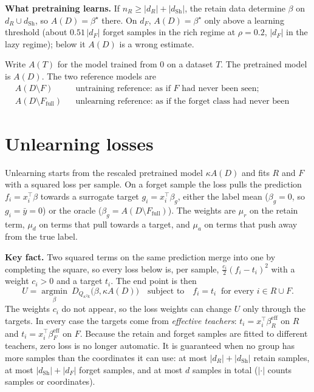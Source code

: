 \documentclass[10pt]{article}
\newcommand{\Ff}{F_{\mathrm{full}}}
\newcommand{\dSh}{d_{\mathrm{Sh}}}
\begin{document}
\textbf{What pretraining learns.} If $n_R\ge|d_R|+|\dSh|$, the retain data determine $\beta$ on $d_R\cup\dSh$, so $A(D)=\beta^\star$ there. On $d_F$, $A(D)=\beta^\star$ only above a learning threshold (about $0.51\,|d_F|$ forget samples in the rich regime at $\rho=0.2$, $|d_F|$ in the lazy regime); below it $A(D)$ is a wrong estimate.

Write $A(T)$ for the model trained from $0$ on a dataset $T$. The pretrained model is $A(D)$. The two reference models are
\begin{align*}
&A(D\setminus F) && \text{untraining reference: as if $F$ had never been seen;}\\
&A(D\setminus\Ff) && \text{unlearning reference: as if the forget class had never been seen.}
\end{align*}

\section{Unlearning losses}
Unlearning starts from the rescaled pretrained model $\kappa A(D)$ and fits $R$ and $F$ with a squared loss per sample. On a forget sample the loss pulls the prediction $f_i=x_i^\top\beta$ towards a surrogate target $g_i=x_i^\top\beta_g$, either the label mean ($\beta_g=0$, so $g_i=\bar y=0$) or the oracle ($\beta_g=A(D\setminus\Ff)$). The weights are $\mu_r$ on the retain term, $\mu_d$ on terms that pull towards a target, and $\mu_a$ on terms that push away from the true label.

\textbf{Key fact.} Two squared terms on the same prediction merge into one by completing the square, so every loss below is, per sample, $\frac{c_i}{2}(f_i-t_i)^2$ with a weight $c_i>0$ and a target $t_i$. The end point is then
\[
U=\operatorname*{argmin}_\beta\ D_{Q_{\kappa^2k}}\big(\beta,\kappa A(D)\big)\quad\text{subject to}\quad f_i=t_i\ \text{ for every } i\in R\cup F .
\]
The weights $c_i$ do not appear, so the loss weights can change $U$ only through the targets. In every case the targets come from \emph{effective teachers}: $t_i=x_i^\top\beta^{\mathrm{eff}}_R$ on $R$ and $t_i=x_i^\top\beta^{\mathrm{eff}}_F$ on $F$. Because the retain and forget samples are fitted to different teachers, zero loss is no longer automatic. It is guaranteed when no group has more samples than the coordinates it can use: at most $|d_R|+|\dSh|$ retain samples, at most $|\dSh|+|d_F|$ forget samples, and at most $d$ samples in total ($|\cdot|$ counts samples or coordinates).
\end{document}
